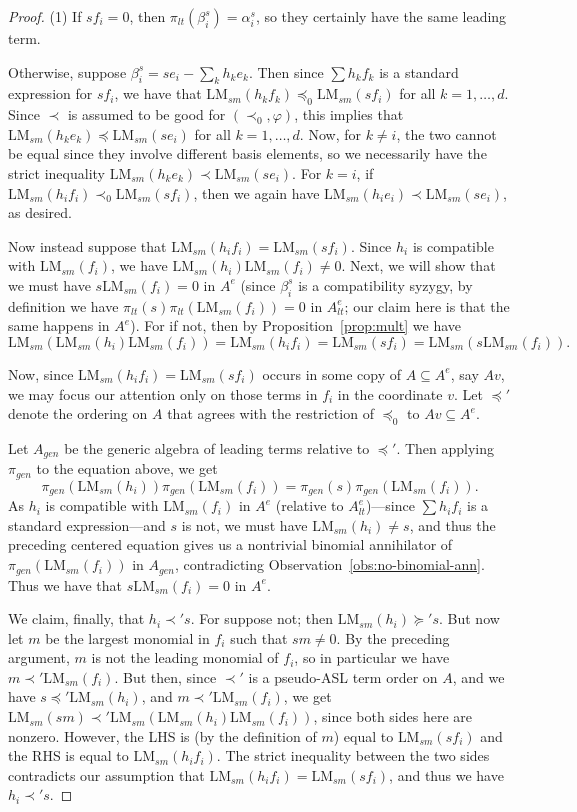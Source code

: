 \documentclass[11pt,reqno]{amsart}
\newcommand{\lmsm}{\text{LM}_{sm}}
\newcommand{\piltd}{\pi_{lt}}
\theoremstyle{definition}
\numberwithin{equation}{section}
\begin{document}
\begin{proof}
(1) If $s f_i = 0$, then $\piltd(\beta_i^s) = \alpha_i^s$, so they certainly have the same leading term. 

Otherwise, suppose $\beta_i^s = s e_i - \sum_k h_k e_k$. Then since $\sum h_k f_k$ is a standard expression for $sf_i$, we have that $\lmsm(h_k f_k) \preceq_0 \lmsm(s f_i)$ for all $k=1,\dotsc,d$. Since $\prec$ is assumed to be good for $(\prec_0, \varphi)$, this implies that $\lmsm(h_k e_k) \preceq \lmsm(s e_i)$ for all $k=1,\dotsc,d$. Now, for $k \neq i$, the two cannot be equal since they involve different basis elements, so we necessarily have the strict inequality $\lmsm(h_k e_k) \prec \lmsm(s e_i)$. For $k=i$, if $\lmsm(h_i f_i) \prec_0 \lmsm(s f_i)$, then we again have $\lmsm(h_i e_i) \prec \lmsm(s e_i)$, as desired. 

Now instead suppose that $\lmsm(h_i f_i) = \lmsm(s f_i)$. Since $h_i$ is compatible with $\lmsm(f_i)$, we have $\lmsm(h_i) \lmsm(f_i) \neq 0$. Next, we will show that we must have $s \lmsm(f_i) = 0$ in $A^e$ (since $\beta_i^s$ is a compatibility syzygy, by definition we have $\pi_{lt}(s) \piltd(\lmsm(f_i)) = 0$ in $A_{lt}^e$; our claim here is that the same happens in $A^e$). For if not, then by Proposition~\ref{prop:mult} we have 
\[
\lmsm(\lmsm(h_i) \lmsm(f_i)) = \lmsm(h_i f_i) = \lmsm(s f_i) = \lmsm(s \lmsm(f_i)).
\]

Now, since $\lmsm(h_i f_i) = \lmsm(s f_i)$ occurs in some copy of $A \subseteq A^e$, say $Av$, we may focus our attention only on those terms in $f_i$ in the coordinate $v$. Let $\preceq'$ denote the ordering on $A$ that agrees with the restriction of $\preceq_0$ to $Av \subseteq A^e$. 

Let $A_{gen}$ be the generic algebra of leading terms relative to $\preceq'$. Then applying $\pi_{gen}$ to the equation above, we get 
\[
\pi_{gen}(\lmsm(h_i)) \pi_{gen}(\lmsm(f_i)) = \pi_{gen}(s) \pi_{gen}(\lmsm(f_i)).
\]
As $h_i$ is compatible with $\lmsm(f_i)$ in $A^e$ (relative to $A_{lt}^e$)---since $\sum h_i f_i$ is a standard expression---and $s$ is not, we must have $\lmsm(h_i) \neq s$, and thus the preceding centered equation gives us a nontrivial binomial annihilator of $\pi_{gen}(\lmsm(f_i))$ in $A_{gen}$, contradicting Observation~\ref{obs:no-binomial-ann}. Thus we have that $s \lmsm(f_i) = 0$ in $A^e$.


We claim, finally, that $h_i \prec' s$. For suppose not; then $\lmsm(h_i) \succeq' s$. But now let $m$ be the largest monomial in $f_i$ such that $s m \neq 0$. By the preceding argument, $m$ is not the leading monomial of $f_i$, so in particular we have $m \prec' \lmsm(f_i)$. But then, since $\prec'$ is a pseudo-ASL term order on $A$, and we have $s \preceq' \lmsm(h_i)$, and $m \prec' \lmsm(f_i)$, we get
$\lmsm(s m) \prec' \lmsm(\lmsm(h_i) \lmsm(f_i))$, since both sides here are nonzero. However, the LHS is (by the definition of $m$) equal to $\lmsm(s f_i)$ and the RHS is equal to $\lmsm(h_i f_i)$. The strict inequality between the two sides contradicts our assumption that $\lmsm(h_i f_i) = \lmsm(s f_i)$, and thus we have $h_i \prec' s$. 


\end{proof}
\end{document}
